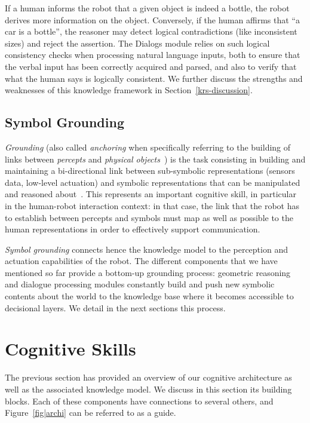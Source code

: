 \documentclass[preprint,3p,times]{elsarticle}
\begin{document}
If a human informs the robot that a given object is indeed a bottle, the robot
derives more information on the object. Conversely, if the human affirms that
``a car is a bottle'', the reasoner may detect logical contradictions (like
inconsistent sizes) and reject the assertion. The {\sc Dialogs} module relies
on such logical consistency checks when processing natural language inputs,
both to ensure that the verbal input has been correctly acquired and parsed,
and also to verify that what the human says is logically consistent.  We
further discuss the strengths and weaknesses of this knowledge framework in
Section~\ref{krs-discussion}.

\subsection{Symbol Grounding}

\emph{Grounding} (also called \emph{anchoring} when specifically referring to
the building of links between \emph{percepts} and \emph{physical
objects}~\cite{Coradeschi2003}) is the task consisting in building and
maintaining a bi-directional link between sub-symbolic representations (sensors
data, low-level actuation) and symbolic representations that can be manipulated
and reasoned about~\cite{Harnad1990}. This represents an important cognitive
skill, in particular in the human-robot interaction context: in that case, the
link that the robot has to establish between percepts and symbols must
map as well as possible to the human representations in order to effectively
support communication.

\emph{Symbol grounding} connects hence the knowledge model to the perception and
actuation capabilities of the robot. The different components that we have
mentioned so far provide a bottom-up grounding process: geometric reasoning and
dialogue processing modules constantly build and push new symbolic contents
about the world to the knowledge base where it becomes accessible to decisional
layers. We detail in the next sections this process. 


\section{Cognitive Skills}
\label{sec:impl}

The previous section has provided an overview of our cognitive architecture
as well as the associated knowledge model. We discuss in this section its
building blocks. Each of these components have connections to several
others, and Figure~\ref{fig|archi} can be referred to as a guide.
\end{document}
